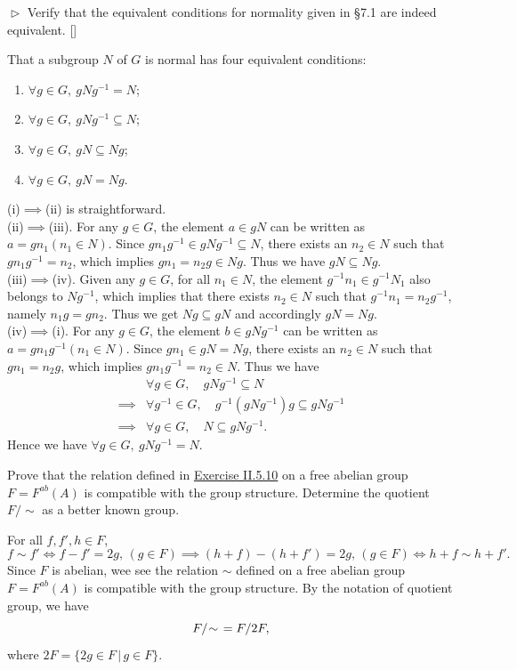 \documentclass[12pt,letterpaper,boxed]{hmcpset}
\begin{document}
\begin{problem}[7.3]
$\vartriangleright$ Verify that the equivalent conditions for normality given in §7.1 are indeed equivalent. []
\end{problem}
\begin{solution}
That a subgroup $N$ of $G$ is normal has four equivalent conditions:
\begin{enumerate}
	\item[(i)] $\forall g\in G,\ gNg^{-1}= N$;
	\item[(ii)] $\forall g\in G,\ gNg^{-1}\subseteq N$;
	\item[(iii)] $\forall g\in G,\ gN\subseteq Ng$;
	\item[(iv)] $\forall g\in G,\ gN= Ng$.
\end{enumerate}
(i)$\implies$(ii) is straightforward. \\
(ii)$\implies$(iii). For any $g\in G$, the element $a\in gN$ can be written as $a=gn_1(n_1\in N)$. Since $gn_1g^{-1}\in gNg^{-1}\subseteq N$, there exists an $n_2\in N$ such that $gn_1g^{-1}=n_2$, which implies $gn_1=n_2g\in Ng$. Thus we have $gN\subseteq Ng$.\\	
(iii)$\implies$(iv). Given any $g\in G$, for all $n_1\in N$, the element $g^{-1}n_1\in g^{-1}N_1$ also belongs to $Ng^{-1}$, which implies that there exists $n_2\in N$ such that $g^{-1}n_1=n_2g^{-1}$, namely $n_1g=gn_2$. Thus we get $Ng\subseteq gN$ and accordingly $gN= Ng$.\\
(iv)$\implies$(i). For any $g\in G$, the element $b\in gNg^{-1}$ can be written as $a=gn_1g^{-1}(n_1\in N)$. Since $gn_1\in gN= Ng$, there exists an $n_2\in N$ such that $gn_1=n_2g$, which implies $gn_1g^{-1}=n_2\in N$. Thus we have 
\begin{align*}
	&\forall g\in G,\quad gNg^{-1}\subseteq N\\
	\implies& \forall g^{-1}\in G,\quad g^{-1}(gNg^{-1})g\subseteq gNg^{-1}\\
	\implies& \forall g\in G,\quad N\subseteq gNg^{-1}.
\end{align*}
Hence we have $\forall g\in G,\ gNg^{-1}=N$.
\end{solution}


\begin{problem}[7.4]
Prove that the relation defined in \hyperlink{Exercise II.5.10}{Exercise II.5.10} on a free abelian group $F =F^{ab}(A)$ is compatible with the group structure. Determine the quotient $F/\sim$ as a better known group.
\end{problem}
\begin{solution}
For all $f,f',h\in F$,
\[
f\sim f'\iff f-f'=2g,\,(g\in F)\implies (h+f)-(h+f')=2g,\,(g\in F)\iff h+f\sim h+f'.
\]
Since $F$ is abelian, wee see the relation $\sim$ defined on a free abelian group $F =F^{ab}(A)$ is compatible with the group structure. By the notation of quotient group, we have 
\[
F/\hspace{-2pt}\sim\hspace{4pt}=F/2F,
\]
where $2F=\{2g\in F\,|\,g\in F\}$.
\end{solution}
\end{document}

